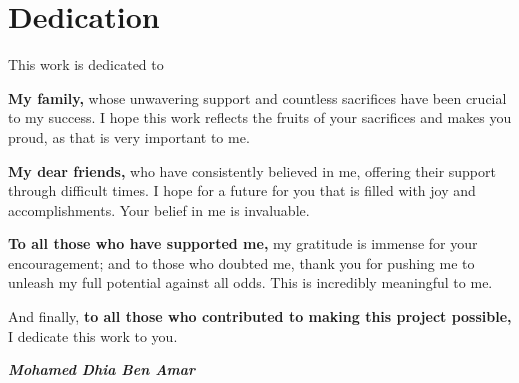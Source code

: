 \chapter*{Dedication}    

This work is dedicated to
\newline

\textbf{My family,} whose unwavering support and countless sacrifices have been crucial to my success. I hope this work reflects the fruits of your sacrifices and makes you proud, as that is very important to me.
\newline

\textbf{My dear friends,} who have consistently believed in me, offering their support through difficult times. I hope for a future for you that is filled with joy and accomplishments. Your belief in me is invaluable.
\newline

\textbf{To all those who have supported me,} my gratitude is immense for your encouragement; and to those who doubted me, thank you for pushing me to unleash my full potential against all odds. This is incredibly meaningful to me.
\newline

And finally, \textbf{to all those who contributed to making this project possible,} I dedicate this work to you.
\newline

\begin{flushright}
\textbf{\textit{Mohamed Dhia Ben Amar}}
\end{flushright}

